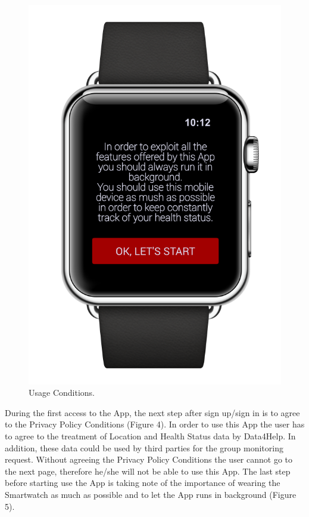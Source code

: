 \begin{enumerate}
\begin{figure}[H]
\begin{center}
\begin{minipage}[c]{.40\textwidth}
          \includegraphics[height=12 cm]{Images/Mockups/AutomatedSOSMockup4.png}
          	\caption{Usage Conditions.}
        \end{minipage}
      \end{center}
\end{figure}
During the first access to the App, the next step after sign up/sign in is to agree to the Privacy Policy Conditions (Figure 4). In order to use this App the user has to agree to the treatment of Location and Health Status data by Data4Help. In addition, these data could be used by third parties for the group monitoring request. Without agreeing the Privacy Policy Conditions the user cannot go to the next page, therefore he/she will not be able to use this App. The last step before starting use the App is taking note of the importance of wearing the Smartwatch as much as possible and to let the App runs in background (Figure 5).
\clearpage
\begin{figure}
\begin{center}
	\bigbreak
        \begin{minipage}[c]{.40\textwidth}
        \centering

\end{minipage}
\end{center}
\end{figure}
\end{enumerate}
